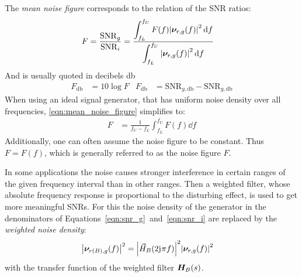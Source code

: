 The \emph{mean noise figure} corresponds to the relation of the \ac{SNR} ratios:
\begin{align}
  F &= \frac{\mathrm{SNR}_g}{\mathrm{SNR}_i} = \frac{\displaystyle \int_{f_L}^{f_U} F(f)\abs{\bm{\nu}_{r,g}(f)}^2 \dd{f}}{\displaystyle \int_{f_L}^{f_U} \abs{\bm{\nu}_{r,g}(f)}^2 \dd{f}} \label{eqn:mean_noise_figure}
\end{align}
And is usually quoted in decibels \si{\decibel}
\begin{align}
  F_{\si{\decibel}} &= 10\log F &F_{\si{\decibel}} &= \mathrm{SNR}_{g,\si{\decibel}} - \mathrm{SNR}_{g,\si{\decibel}}
\end{align}
When using an ideal signal generator, that has uniform noise density over all frequencies, \eqref{eqn:mean_noise_figure} simplifies to:
\begin{align}
  F &= \frac{1}{f_U-f_L}\int_{f_L}^{f_U} F(f)\dd{f}
\end{align}
Additionally, one can often assume the noise figure to be constant. Thus $F=F(f)$, which is generally referred to as the noise figure $F$.

In some applications the noise causes stronger interference in certain ranges of the given frequency interval than in other ranges. Then a weighted filter, whose absolute frequency response is proportional to the disturbing effect, is used to get more meaningful \ac{SNR}s. For this the noise density of the generator in the denominators of Equations~\ref{eqn:snr_g}~and~\ref{eqn:snr_i} are replaced by the \emph{weighted noise density}:
\begin{align}
  \abs{\bm{\nu}_{r(B),g}(f)}^2 &= \abs{\vec{H}_B(2\mathrm{j}\mkern1mu\pi f)}^2\abs{\bm{\nu}_{r,g}(f)}^2
\end{align}
with the transfer function of the weighted filter $\bm{H}_B(s)$.

